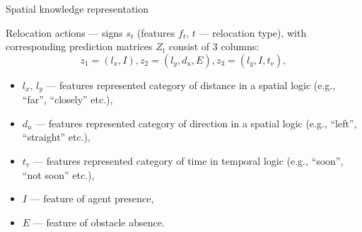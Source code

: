 \documentclass[default]{beamer}
\begin{document}
		\begin{frame}{Spatial knowledge representation}
		
			Relocation actions --- signs $s_t$ (features $f_t$, $t$ --- relocation type), with corresponding prediction matrices $Z_t$ consist of 3 columns:
			\[
			z_1=(l_x, I), z_2=(l_y, d_u, E), z_3=(l_y, I, t_v),
			\]
			\begin{itemize}
			\item $l_x$, $l_y$ --- features represented category of distance in a spatial logic (e.g., ``far'', ``closely'' etc.), 
			\item $d_u$ --- features represented category of direction in a spatial logic (e.g., ``left'', ``straight'' etc.), 
			\item $t_v$ --- features represented category of time in temporal logic (e.g., ``soon'', ``not soon'' etc.),
			\item $I$ --- feature of agent presence, 
			\item $E$ --- feature of obstacle absence.
			\end{itemize}
			\vspace{-5pt}
			\nocite{*}
			\printbibliography[keyword={spatial}, resetnumbers=true]
		\end{frame}
\end{document}

